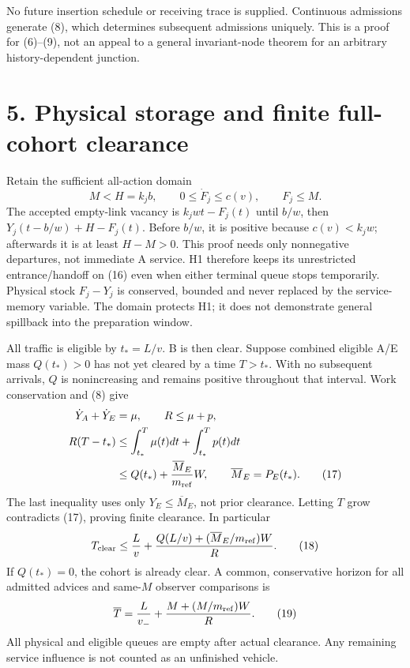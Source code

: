 \documentclass[11pt,a4paper]{article}
\begin{document}
No future insertion schedule or receiving trace is supplied. Continuous
admissions generate (8), which determines subsequent admissions uniquely.
This is a proof for (6)--(9), not an appeal to a general invariant-node
theorem for an arbitrary history-dependent junction.

\newpage
\section*{5. Physical storage and finite full-cohort clearance}

Retain the sufficient all-action domain
\begin{equation}
 M< H=k_jb,\qquad 0\leq\dot F_j\leq c(v),\qquad F_j\leq M.
 \tag{16}
\end{equation}
The accepted empty-link vacancy is $k_jwt-F_j(t)$ until $b/w$, then
$Y_j(t-b/w)+H-F_j(t)$. Before $b/w$, it is positive because
$c(v)<k_jw$; afterwards it is at least $H-M>0$. This proof needs only
nonnegative departures, not immediate A service. H1 therefore keeps its
unrestricted entrance/handoff on (16) even when either terminal queue
stops temporarily. Physical stock $F_j-Y_j$ is conserved, bounded and
never replaced by the service-memory variable. The domain protects H1;
it does not demonstrate general spillback into the preparation window.

All traffic is eligible by $t_*=L/v$. B is then clear. Suppose combined
eligible A/E mass $Q(t_*)>0$ has not yet cleared by a time $T>t_*$.
With no subsequent arrivals, $Q$ is nonincreasing and remains positive
throughout that interval. Work conservation and (8) give
\begin{align}
 \dot Y_A+\dot Y_E&=\mu,\qquad R\leq\mu+p,\nonumber\\
 R(T-t_*)&\leq\int_{t_*}^T\mu(t)dt+\int_{t_*}^Tp(t)dt\nonumber\\
 &\leq Q(t_*)+\frac{\overline M_E}{m_{\rm ref}}W,
 \qquad \overline M_E=P_E(t_*).
 \tag{17}
\end{align}
The last inequality uses only $Y_E\leq\overline M_E$, not prior clearance.
Letting $T$ grow contradicts (17), proving finite clearance. In particular
\begin{equation}
 T_{\rm clear}\leq \frac{L}{v}
   +\frac{Q(L/v)+(\overline M_E/m_{\rm ref})W}{R}.
 \tag{18}
\end{equation}
If $Q(t_*)=0$, the cohort is already clear. A common, conservative horizon
for all admitted advices and same-$M$ observer comparisons is
\begin{equation}
 \overline T=\frac{L}{v_-}+\frac{M+(M/m_{\rm ref})W}{R}.
 \tag{19}
\end{equation}
All physical and eligible queues are empty after actual clearance. Any
remaining service influence is not counted as an unfinished vehicle.
\end{document}
